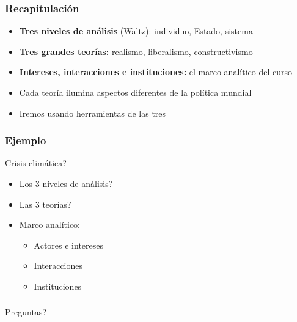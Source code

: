 \begin{frame}
\frametitle{Recapitulación}
\centering

\begin{itemize}
  \item \textbf{Tres niveles de análisis} (Waltz): individuo, Estado, sistema
  \item \textbf{Tres grandes teorías:} realismo, liberalismo, constructivismo
  \item \textbf{Intereses, interacciones e instituciones:} el marco analítico del curso
  \item<2-> Cada teoría ilumina aspectos diferentes de la política mundial
  \item<2-> Iremos usando herramientas de las tres
\end{itemize}

\end{frame}

\begin{frame}
\frametitle{Ejemplo}
\centering

{\Large Crisis climática?}

\vspace{30pt}

\begin{itemize}
  \item Los 3 niveles de análisis?
  \item Las 3 teorías?
  \item Marco analítico:
  \begin{itemize}
    \item Actores e intereses
    \item Interacciones
    \item Instituciones
  \end{itemize}
\end{itemize}

\end{frame}
\note{---}

\begin{frame}
\frametitle{}
\centering

Preguntas?

\end{frame}
\note{}
